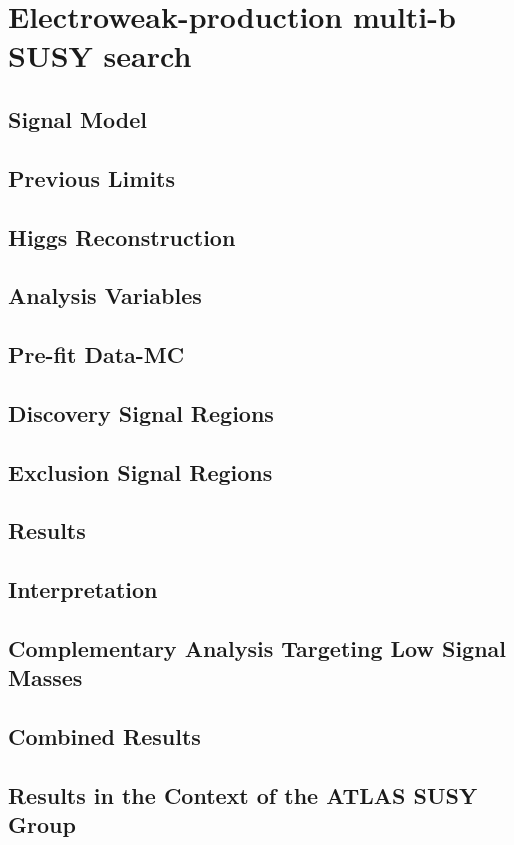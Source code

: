 \chapter{Electroweak-production multi-b SUSY search}
\label{chap:ewk_prod}


\section{Signal Model}

\section{Previous Limits}

\section{Higgs Reconstruction}

\section{Analysis Variables}


\section{Pre-fit Data-MC}


\section{Discovery Signal Regions}


\section{Exclusion Signal Regions}


\section{Results}


\section{Interpretation}

\section{Complementary Analysis Targeting Low Signal Masses}


\section{Combined Results}

\section{Results in the Context of the ATLAS SUSY Group}